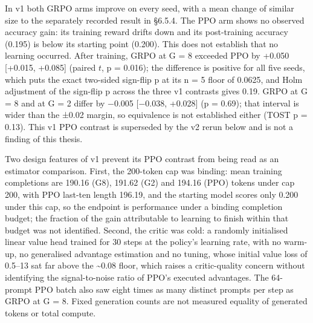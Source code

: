 \documentclass[12pt,a4paper]{report}
\begin{document}
In v1 both GRPO arms improve on every seed, with a mean change of
similar size to the separately recorded result in §6.5.4. The PPO arm
shows no observed accuracy gain: its training reward drifts down and its
post-training accuracy (0.195) is below its starting point (0.200). This
does not establish that no learning occurred. After training, GRPO at G
= 8 exceeded PPO by +0.050 {[}+0.015, +0.085{]} (paired \(t\), p =
0.016); the difference is positive for all five seeds, which puts the
exact two-sided sign-flip p at its n = 5 floor of 0.0625, and Holm
adjustment of the sign-flip p across the three v1 contrasts gives 0.19.
GRPO at G = 8 and at G = 2 differ by −0.005 {[}−0.038, +0.028{]} (p =
0.69); that interval is wider than the ±0.02 margin, so equivalence is
not established either (TOST p = 0.13). This v1 PPO contrast is
superseded by the v2 rerun below and is not a finding of this thesis.

Two design features of v1 prevent its PPO contrast from being read as an
estimator comparison. First, the 200-token cap was binding: mean
training completions are 190.16 (G8), 191.62 (G2) and 194.16 (PPO)
tokens under cap 200, with PPO last-ten length 196.19, and the starting
model scores only 0.200 under this cap, so the endpoint is performance
under a binding completion budget; the fraction of the gain attributable
to learning to finish within that budget was not identified. Second, the
critic was cold: a randomly initialised linear value head trained for 30
steps at the policy's learning rate, with no warm-up, no generalised
advantage estimation and no tuning, whose initial value loss of 0.5--13
sat far above the \textasciitilde0.08 floor, which raises a
critic-quality concern without identifying the signal-to-noise ratio of
PPO's executed advantages. The 64-prompt PPO batch also saw eight times
as many distinct prompts per step as GRPO at G = 8. Fixed generation
counts are not measured equality of generated tokens or total compute.
\end{document}
